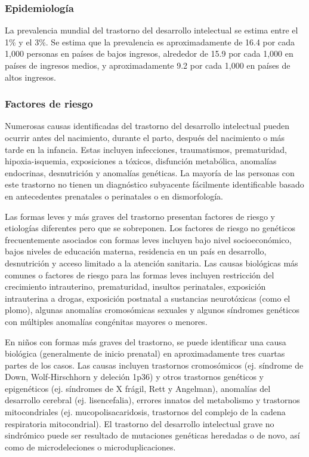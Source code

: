 \documentclass[11pt,letterpaper]{report}
\begin{document}
\subsubsection{Epidemiología}
La prevalencia mundial del trastorno del desarrollo intelectual se estima
entre el 1\% y el 3\%. Se estima que la prevalencia es aproximadamente de 16.4
por cada 1,000 personas en países de bajos ingresos, alrededor de 15.9 por cada
1,000 en países de ingresos medios, y aproximadamente 9.2 por cada 1,000 en
países de altos ingresos. \cite{vanKarnebeek2018, Nelson56}

\subsubsection{Factores de riesgo}
Numerosas causas identificadas del trastorno del desarrollo intelectual pueden
ocurrir antes del nacimiento, durante el parto, después del nacimiento o más 
tarde en la infancia. Estas incluyen infecciones, traumatismos, prematuridad,
hipoxia-isquemia, exposiciones a tóxicos, disfunción metabólica, anomalías
endocrinas, desnutrición y anomalías genéticas. La mayoría de las personas con
este trastorno no tienen un diagnóstico subyacente fácilmente identificable
basado en antecedentes prenatales o perinatales o en dismorfología.
\cite{Nelson56}

Las formas leves y más graves del trastorno presentan factores de riesgo y
etiologías diferentes pero que se sobreponen. Los factores de riesgo no
genéticos frecuentemente asociados con formas leves incluyen bajo nivel
socioeconómico, bajos niveles de educación materna, residencia en un país en
desarrollo, desnutrición y acceso limitado a la atención sanitaria. Las causas
biológicas más comunes o factores de riesgo para las formas leves incluyen
restricción del crecimiento intrauterino, prematuridad, insultos perinatales,
exposición intrauterina a drogas, exposición postnatal a sustancias
neurotóxicas (como el plomo), algunas anomalías cromosómicas sexuales y algunos
síndromes genéticos con múltiples anomalías congénitas mayores o menores.
\cite{Nelson56}

En niños con formas más graves del trastorno, se puede identificar una causa
biológica (generalmente de inicio prenatal) en aproximadamente tres cuartas
partes de los casos. Las causas incluyen trastornos cromosómicos (ej. síndrome
de Down, Wolf-Hirschhorn y deleción 1p36) y otros trastornos genéticos y
epigenéticos (ej. síndromes de X frágil, Rett y Angelman), anomalías del
desarrollo cerebral (ej. lisencefalia), errores innatos del metabolismo y
trastornos mitocondriales (ej. mucopolisacaridosis, trastornos del complejo de
la cadena respiratoria mitocondrial). El trastorno del desarrollo intelectual
grave no sindrómico puede ser resultado de mutaciones genéticas heredadas o de
novo, así como de microdeleciones o microduplicaciones. \cite{Nelson56}
\end{document}
